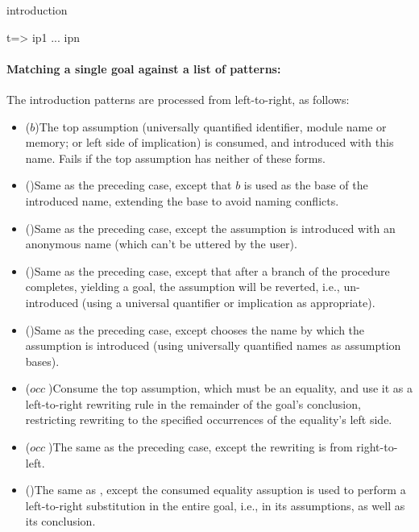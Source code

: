 \begin{tactic}[$t$ =>$\;\iota_1 \cdots \iota_n$]{introduction}
\begin{tsyntax}[empty]{t=> ip1 ... ipn}
    \paragraph{Matching a single goal against a list of patterns:}

    The introduction patterns are processed from left-to-right, as
    follows:
    \begin{itemize}
    \item ($b$)\quad The top assumption (universally quantified
      identifier, module name or memory; or left side of implication)
      is consumed, and introduced with this name. Fails if the top
      assumption has neither of these forms.

    \item ()\quad Same as the preceding case, except that
      $b$ is used as the base of the introduced name, extending the
      base to avoid naming conflicts.

    \item (\ec{_})\quad Same as the preceding case, except the
      assumption is introduced with an anonymous name (which can't be
      uttered by the user).

    \item (\ec{+})\quad Same as the preceding case, except that after
      a branch of the procedure completes, yielding a goal, the
      assumption will be reverted, i.e., un-introduced (using a
      universal quantifier or implication as appropriate).

    \item ()\quad Same as the preceding case, except \EasyCrypt
      chooses the name by which the assumption is introduced (using
      universally quantified names as assumption bases).

    \item ($\mathit{occ}\;$\ec{->})\quad Consume the top assumption,
      which must be an equality, and use it as a left-to-right rewriting
      rule in the remainder of the goal's conclusion, restricting rewriting
      to the specified occurrences of the equality's left side.

    \item ($\mathit{occ}\;$\ec{<-})\quad The same as the preceding case,
      except the rewriting is from right-to-left.

    \item (\ec{->>})\quad The same as \ec{->}, except the consumed
      equality assuption is used to perform a left-to-right substitution
      in the entire goal, i.e., in its assumptions, as well as its
      conclusion.


\end{itemize}
\end{tsyntax}
\end{tactic}
